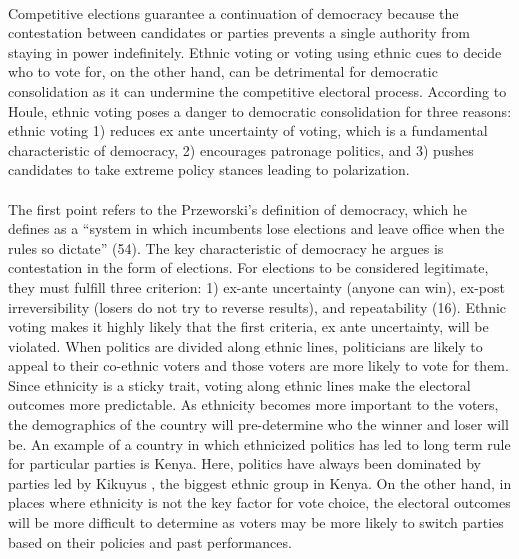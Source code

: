 \documentclass[a4paper, 12pt]{article}
\begin{document}
\paragraph{} 
Competitive elections guarantee a continuation of democracy because the contestation between candidates or parties prevents a single authority from staying in power indefinitely\cite{przeworskiDemocracyDevelopmentPolitical2000}. Ethnic voting or voting using ethnic cues to decide who to vote for, on the other hand, can be detrimental for democratic consolidation as it can undermine the competitive electoral process. According to Houle\cite{houleDoesEthnicVoting2018}, ethnic voting poses a danger to democratic consolidation for three reasons: ethnic voting 1) reduces ex ante uncertainty of voting, which is a fundamental characteristic of democracy\cite{przeworskiDemocracyDevelopmentPolitical2000}, 2) encourages patronage politics\cite{chandraWhyEthnicParties2004}, and 3) pushes candidates to take extreme policy stances leading to polarization\cite{horowitzEthnicGroupsConflict1985, rabushkaPoliticsPluralSocieties1972, chandraWhyEthnicParties2004, houleDoesEthnicVoting2018}.
\paragraph{}
The first point refers to the Przeworski’s definition of democracy, which he defines as a “system in which incumbents lose elections and leave office when the rules so dictate”\cite{przeworskiDemocracyDevelopmentPolitical2000} (54). The key characteristic of democracy he argues is contestation in the form of elections. For elections to be considered legitimate, they must fulfill three criterion: 1) ex-ante uncertainty (anyone can win), ex-post irreversibility (losers do not try to reverse results), and repeatability\cite{przeworskiDemocracyDevelopmentPolitical2000} (16). Ethnic voting makes it highly likely that the first criteria, ex ante uncertainty, will be violated. When politics are divided along ethnic lines, politicians are likely to appeal to their co-ethnic voters and those voters are more likely to vote for them. Since ethnicity is a sticky trait, voting along ethnic lines make the electoral outcomes more predictable. As ethnicity becomes more important to the voters, the demographics of the country will pre-determine who the winner and loser will be. An example of a country in which ethnicized politics has led to long term rule for particular parties is Kenya. Here, politics have always been dominated by parties led by Kikuyus , the biggest ethnic group in Kenya. On the other hand, in places where ethnicity is not the key factor for vote choice, the electoral outcomes will be more difficult to determine as voters may be more likely to switch parties based on their policies and past performances.
\end{document}
